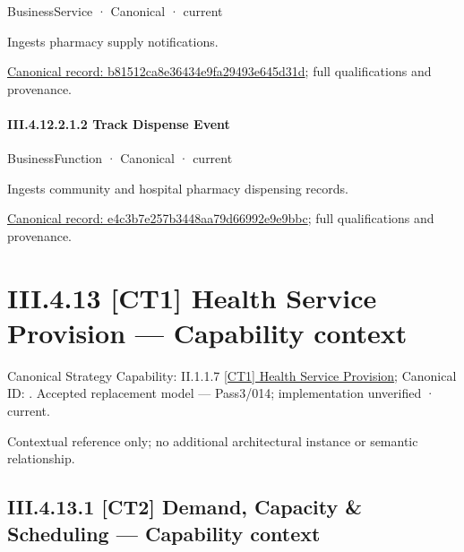 \label{element:b81512ca8e36434e9fa29493e645d31d}
{\small BusinessService · Canonical · current}\par

Ingests pharmacy supply notifications.


{\footnotesize \href{../../../../../../../../continuum/business/business-service/b81512ca8e36434e9fa29493e645d31d.md}{Canonical record: b81512ca8e36434e9fa29493e645d31d}; full qualifications and provenance.}\par
\paragraph*{III.4.12.2.1.2 Track Dispense Event}
\label{navigation:III.4.12.2.1.2}

\label{element:e4c3b7e257b3448aa79d66992e9e9bbc}
{\small BusinessFunction · Canonical · current}\par

Ingests community and hospital pharmacy dispensing records.


{\footnotesize \href{../../../../../../../../continuum/business/business-function/e4c3b7e257b3448aa79d66992e9e9bbc.md}{Canonical record: e4c3b7e257b3448aa79d66992e9e9bbc}; full qualifications and provenance.}\par
\section*{III.4.13 [CT1] Health Service Provision — Capability context}
\label{navigation:III.4.13}

{\small Canonical Strategy Capability: II.1.1.7 \hyperref[element:c832a767d295445d8925dd0af885950e]{[CT1] Health Service Provision}; Canonical ID: \texttt{}. Accepted replacement model — Pass3/014; implementation unverified · current.}\par
Contextual reference only; no additional architectural instance or semantic relationship.\par
\subsection*{III.4.13.1 [CT2] Demand, Capacity \& Scheduling — Capability context}
\label{navigation:III.4.13.1}

